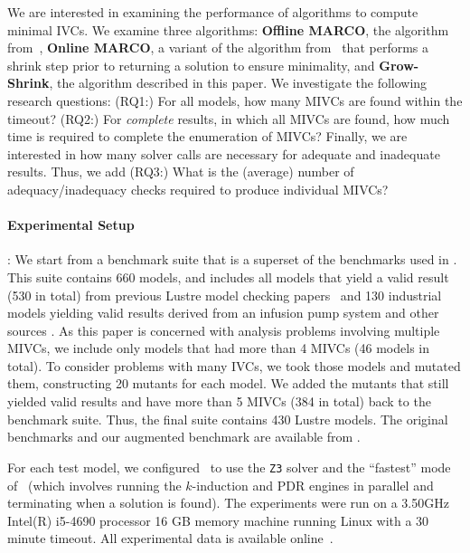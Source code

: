 We are interested in examining the performance of algorithms to compute minimal IVCs.  We examine three algorithms: \textbf{Offline MARCO}, the algorithm from~\cite{Ghass17AllIVCs}, \textbf{Online MARCO}, a variant of the algorithm from~\cite{Ghass17AllIVCs} that performs a shrink step prior to returning a solution to ensure minimality, and \textbf{Grow-Shrink}, the algorithm described in this paper.  We investigate the following research questions: (RQ1:) For all models, how many MIVCs are found within the timeout?  (RQ2:) For {\em complete} results, in which all MIVCs are found, how much time is required to complete the enumeration of MIVCs?  Finally, we are interested in how many solver calls are necessary for adequate and inadequate results.  Thus, we add (RQ3:) What is the (average) number of adequacy/inadequacy checks required to produce individual MIVCs?


\paragraph{Experimental Setup}:  We start from a benchmark suite that is a superset of the benchmarks used in \cite{Ghass17AllIVCs}. This suite contains 660 models, and includes all models that yield a valid result (530 in total) from previous Lustre model checking papers~\cite{Hagen08:FMCAD,piskac2016} and 130 industrial models yielding valid results derived from an infusion pump system \cite{hilt2013} and other sources \cite{piskac2016,NFM2015:backes}.
As this paper is concerned with analysis problems involving multiple MIVCs, we include only models that had more than 4 MIVCs (46 models in total).  To consider problems with many IVCs, we took those models and mutated them, constructing 20 mutants for each model.  We added the mutants that still yielded valid results and have more than 5 MIVCs (384 in total) back to the benchmark suite.
Thus, the final suite contains 430 Lustre models. The original benchmarks and our augmented benchmark are available from \cite{bench}.

For each test model, we configured \jkind\ to use the \texttt{Z3} solver and the ``fastest'' mode of \jkind\ (which involves running the $k$-induction and PDR engines in parallel and terminating when a solution is found). The experiments were run on a  3.50GHz  Intel(R) i5-4690 processor 16 GB memory machine running Linux with a 30 minute timeout.  All experimental data is available online~\cite{expr}.




